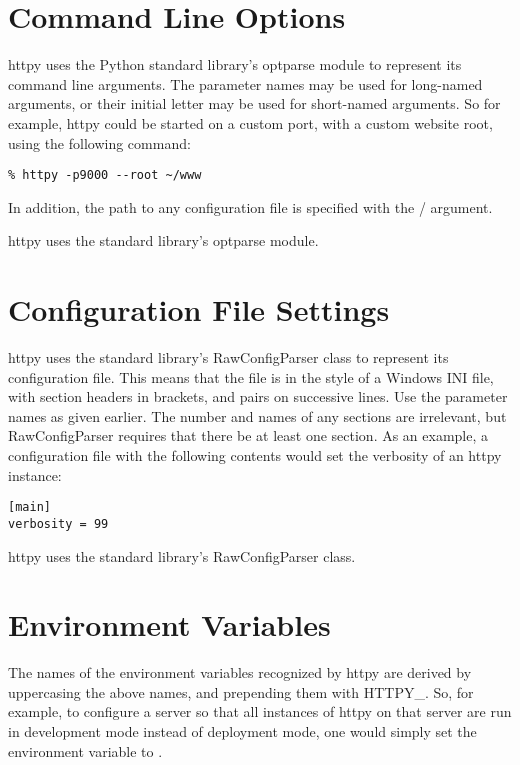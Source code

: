 \section{Command Line Options}

httpy uses the Python standard library's optparse module to represent its
command line arguments. The parameter names may be used for long-named
arguments, or their initial letter may be used for short-named arguments. So for
example, httpy could be started on a custom port, with a custom website root,
using the following command:

\begin{verbatim}
% httpy -p9000 --root ~/www
\end{verbatim}

In addition, the path to any configuration file is specified with the
/ argument.

\begin{seealso}
          {httpy uses the standard library's optparse module.}
\end{seealso}




\section{Configuration File Settings}

httpy uses the standard library's RawConfigParser class to represent its
configuration file. This means that the file is in the style of a Windows INI
file, with section headers in brackets, and  pairs on
successive lines. Use the parameter names as given earlier. The number and names
of any sections are irrelevant, but RawConfigParser requires that there be at
least one section. As an example, a configuration file with the following
contents would set the verbosity of an httpy instance:

\begin{verbatim}
[main]
verbosity = 99
\end{verbatim}

\begin{seealso}
          {httpy uses the standard library's RawConfigParser class.}
\end{seealso}




\section{Environment Variables}

The names of the environment variables recognized by httpy are derived by
uppercasing the above names, and prepending them with HTTPY_. So, for example,
to configure a server so that all instances of httpy on that server are run in
development mode instead of deployment mode, one would simply set the
environment variable  to .
